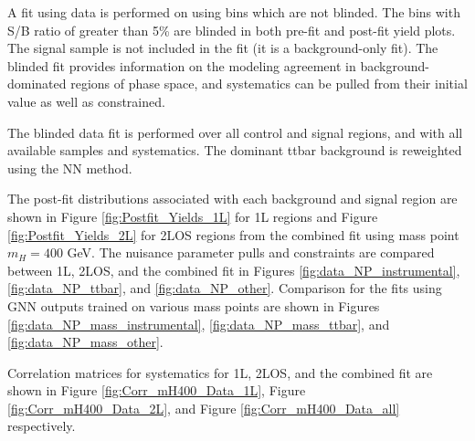 %
A fit using data is performed on using bins which are not blinded. The bins with S/B ratio of greater than 5\% are blinded in both pre-fit and post-fit yield plots. The signal sample is not included in the fit (it is a background-only fit). The blinded fit provides information on the modeling agreement in background-dominated regions of phase space, and systematics can be pulled from their initial value as well as constrained.

The blinded data fit is performed over all control and signal regions, and with all available samples and systematics. The dominant ttbar background is reweighted using the NN method.

The post-fit distributions associated with each background and signal region are shown in Figure \ref{fig:Postfit_Yields_1L} for 1L regions and Figure \ref{fig:Postfit_Yields_2L} for 2LOS regions from the combined fit using mass point $m_H=400$ GeV. The nuisance parameter pulls and constraints are compared between 1L, 2LOS, and the combined fit in Figures \ref{fig:data_NP_instrumental}, \ref{fig:data_NP_ttbar}, and \ref{fig:data_NP_other}. Comparison for the fits using GNN outputs trained on various mass points are shown in Figures \ref{fig:data_NP_mass_instrumental}, \ref{fig:data_NP_mass_ttbar}, and \ref{fig:data_NP_mass_other}.

Correlation matrices for systematics for 1L, 2LOS, and the combined fit are shown in Figure \ref{fig:Corr_mH400_Data_1L}, Figure \ref{fig:Corr_mH400_Data_2L}, and Figure \ref{fig:Corr_mH400_Data_all} respectively.

